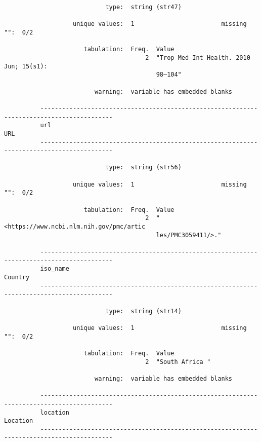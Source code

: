 \documentclass{article}
\begin{document}
\begin{verbatim}
                            type:  string (str47)
          
                   unique values:  1                        missing "":  0/2
          
                      tabulation:  Freq.  Value
                                       2  "Trop Med Int Health. 2010 Jun; 15(s1):
                                          98–104"
          
                         warning:  variable has embedded blanks
          
          ------------------------------------------------------------------------------------------
          url                                                                                    URL
          ------------------------------------------------------------------------------------------
          
                            type:  string (str56)
          
                   unique values:  1                        missing "":  0/2
          
                      tabulation:  Freq.  Value
                                       2  "<https://www.ncbi.nlm.nih.gov/pmc/artic
                                          les/PMC3059411/>."
          
          ------------------------------------------------------------------------------------------
          iso_name                                                                           Country
          ------------------------------------------------------------------------------------------
          
                            type:  string (str14)
          
                   unique values:  1                        missing "":  0/2
          
                      tabulation:  Freq.  Value
                                       2  "South Africa "
          
                         warning:  variable has embedded blanks
          
          ------------------------------------------------------------------------------------------
          location                                                                          Location
          ------------------------------------------------------------------------------------------
          

\end{verbatim}
\end{document}
